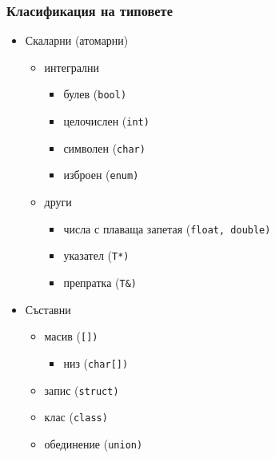 \documentclass[alsotrans]{beamerswitch}
\begin{document}
\begin{frame}
  \frametitle{Класификация на типовете}
  \begin{itemize}
  \item Скаларни (атомарни)
    \begin{itemize}
    \item интегрални
      \begin{itemize}
      \item булев (\tt{bool})
      \item целочислен (\tt{int})
      \item символен (\tt{char})
      \item изброен (\tt{enum})
      \end{itemize}
    \item други
      \begin{itemize}
      \item числа с плаваща запетая (\tt{float}, \tt{double})
      \item указател (\tt{T*})
      \item препратка (\tt{T\&})
      \end{itemize}
    \end{itemize}
  \item Съставни
    \begin{itemize}
    \item масив (\tt{[]})
      \begin{itemize}
      \item низ (\tt{char[]})
      \end{itemize}
    \item запис (\tt{struct})
    \item клас (\tt{class})
    \item обединение (\tt{union})
    \end{itemize}
  \end{itemize}
\end{frame}
\end{document}
